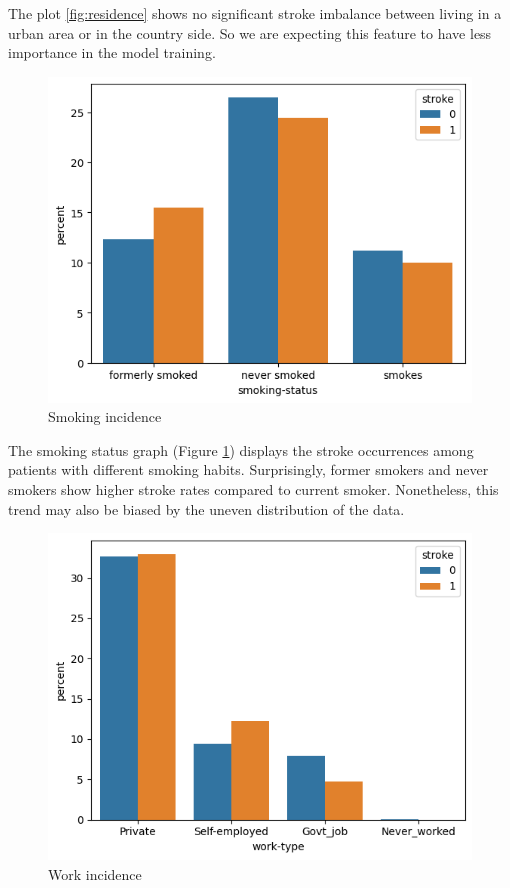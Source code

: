 \documentclass[twocolumn, 9pt]{extarticle}
\begin{document}
The plot \ref{fig:residence} shows no significant stroke imbalance between living in a urban area or in the country side. So we are expecting this feature to have less importance in the model training.


\begin{figure}[h]
\centering
\includegraphics[scale=0.4]{images/smoking_status_graph.png}
\caption{Smoking incidence}
\label{fig:smoking}
\end{figure}

The smoking status graph (Figure \ref{fig:smoking}) displays the stroke occurrences among patients with different smoking habits. Surprisingly, former smokers and never smokers show higher stroke rates compared to current smoker. Nonetheless, this trend may also be biased by the uneven distribution of the data.

\begin{figure}[h]
\centering
\includegraphics[scale=0.4]{images/work_type_graph.png}
\caption{Work incidence}
\label{fig:work}
\end{figure}
\end{document}
